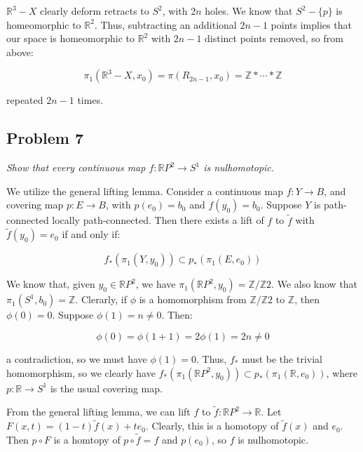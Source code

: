 \documentclass[10pt, oneside]{amsart}
\begin{document}
    $\mathbb{R}^3 - X$ clearly deform retracts to $S^{2}$, with $2n$ holes. We know that $S^{2} - \{p\}$ is homeomorphic to $\mathbb{R}^{2}$. Thus, subtracting an additional $2n - 1$ points implies that our
    space is homeomorphic to $\mathbb{R}^{2}$ with $2n - 1$ distinct points removed, so from above:

    $$\pi_1(\mathbb{R}^{3} - X, x_0) = \pi(R_{2n - 1}, x_0) = \mathbb{Z} * \cdots * \mathbb{Z}$$

    repeated $2n - 1$ times.

    \hrulefill

    \subsection{Problem 7} \textit{Show that every continuous map $f : \mathbb{R} P^2 \rightarrow S^1$ is nulhomotopic.}
    \newline

    We utilize the general lifting lemma. Consider a continuous map $f : Y \rightarrow B$, and covering map $p : E \rightarrow B$, with $p(e_0) = b_0$ and $f(y_0) = b_0$. Suppose $Y$ is path-connected locally path-connected.
    Then there exists a lift of $f$ to $\tilde{f}$ with $\tilde{f}(y_0) = e_0$ if and only if:

    $$f_{*}(\pi_1(Y, y_0)) \subset p_{*}(\pi_1(E, e_0))$$

    We know that, given $y_0 \in \mathbb{R} P^2$, we have $\pi_1(\mathbb{R} P^2, y_0) = \mathbb{Z}/\mathbb{Z}2$. We also know that $\pi_1(S^1, b_0) = \mathbb{Z}$. Clerarly, if $\phi$ is a homomorphism
    from $\mathbb{Z}/\mathbb{Z}2$ to $\mathbb{Z}$, then $\phi(0) = 0$. Suppose $\phi(1) = n \neq 0$. Then:

    $$\phi(0) = \phi(1 + 1) = 2\phi(1) = 2n \neq 0$$

    a contradiction, so we must have $\phi(1) = 0$. Thus, $f_{*}$ must be the trivial homomorphism, so we clearly have $f_{*}(\pi_1(\mathbb{R} P^2, y_0)) \subset p_{*}(\pi_1(\mathbb{R}, e_0))$, where
    $p : \mathbb{R} \rightarrow S^1$ is the usual covering map.
    \newline

    From the general lifting lemma, we can lift $f$ to $\tilde{f} : \mathbb{R} P^2 \rightarrow \mathbb{R}$. Let $F(x, t) = (1 - t) \tilde{f}(x) + t e_0$. Clearly, this is a homotopy of $\tilde{f}(x)$ and
    $e_0$. Then $p \circ F$ is a homtopy of $p \circ \tilde{f} = f$ and $p(e_0)$, so $f$ is nulhomotopic.

    \hrulefill
\end{document}
